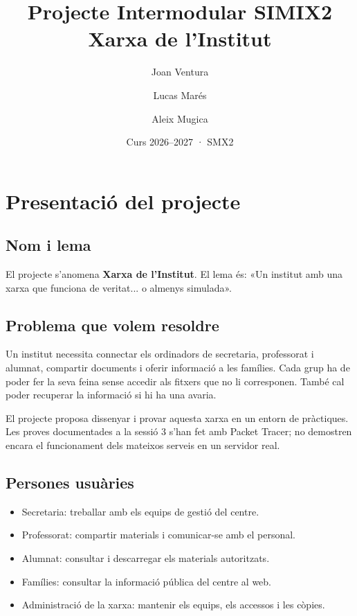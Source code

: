 \documentclass[11pt,a4paper]{report}
\title{Projecte Intermodular SIMIX2\\Xarxa de l'Institut}
\author{Joan Ventura \and Lucas Marés \and Aleix Mugica}
\date{Curs 2026--2027 · SMX2}
\begin{document}
\maketitle
\tableofcontents
\chapter{Presentació del projecte}
\section{Nom i lema}
El projecte s'anomena \textbf{Xarxa de l'Institut}. El lema és: «Un institut amb una xarxa que funciona de veritat... o almenys simulada».
\section{Problema que volem resoldre}
Un institut necessita connectar els ordinadors de secretaria, professorat i alumnat, compartir documents i oferir informació a les famílies. Cada grup ha de poder fer la seva feina sense accedir als fitxers que no li corresponen. També cal poder recuperar la informació si hi ha una avaria.

El projecte proposa dissenyar i provar aquesta xarxa en un entorn de pràctiques. Les proves documentades a la sessió 3 s'han fet amb Packet Tracer; no demostren encara el funcionament dels mateixos serveis en un servidor real.
\section{Persones usuàries}
\begin{itemize}
\item Secretaria: treballar amb els equips de gestió del centre.
\item Professorat: compartir materials i comunicar-se amb el personal.
\item Alumnat: consultar i descarregar els materials autoritzats.
\item Famílies: consultar la informació pública del centre al web.
\item Administració de la xarxa: mantenir els equips, els accessos i les còpies.
\end{itemize}
\end{document}
